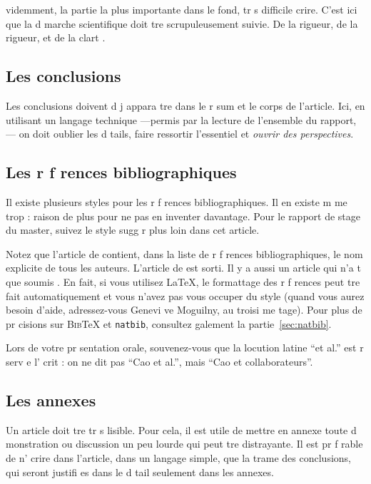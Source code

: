 \documentclass{article}
\begin{document}
 videmment, la partie la plus importante dans le fond, tr s difficile 
   crire. C'est ici que la d marche scientifique doit  tre 
scrupuleusement suivie. De la rigueur, de la rigueur, et de la clart .


\subsection{Les conclusions}

Les conclusions doivent d j  appara tre dans le r sum  et le 
corps de l'article. Ici, en utilisant un langage technique ---permis par la
lecture de l'ensemble du rapport,--- on doit oublier les d tails, faire ressortir l'essentiel et \emph{ouvrir des perspectives\/}.


\subsection{Les r f rences bibliographiques}

Il existe plusieurs styles pour les r f rences bibliographiques. 
Il en existe m me trop : raison de plus pour ne pas en inventer davantage. 
Pour le rapport de stage du master, suivez le style sugg r  plus loin 
dans cet article. 

Notez que l'article de \cite{cao1990simultaneous} contient, dans 
la liste de r f rences bi\-blio\-gra\-phiques, le nom explicite de tous 
les auteurs.
L'article de \cite{crase1992nonlinear} est sorti.  
 Il y a aussi un article qui n'a  t  que 
soumis \citep{mosegaardsoumis}. 
 En fait, si 
vous utilisez \LaTeX, le formattage des r f rences peut  tre fait
automatiquement et vous n'avez pas   vous occuper du style 
(quand vous aurez besoin d'aide, adressez-vous   Genevi ve Moguilny,
au troisi me  tage). Pour plus de pr cisions sur 
\textsc{Bib}\TeX{} et \texttt{natbib}, 
 consultez  galement la partie~\ref{sec:natbib}. 

Lors de votre pr sentation orale, souvenez-vous que la locution latine 
``et al.'' est r serv e   l' crit : on ne dit pas ``Cao et al.'', 
mais ``Cao et collaborateurs''.


\subsection{Les annexes}

Un article doit  tre tr s lisible. Pour cela, il est utile de mettre en 
annexe toute d monstration ou discussion un peu lourde qui peut 
 tre distrayante. Il est pr f rable de n' crire dans l'article, 
dans un langage simple, que la trame des conclusions, qui seront justifi es 
dans le d tail seulement dans les annexes.
\end{document}
